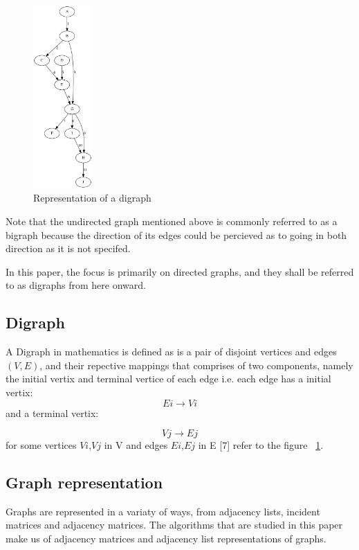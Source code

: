 \begin{figure}[H]
  \begin{center}
      \includegraphics[width=0.2\textwidth]{directedgraph.png}
  \end{center}    
  \caption{Representation of a digraph}
  \label{fig:directedgraph}
\end{figure} 
Note that the undirected graph mentioned above is commonly referred to as a bigraph because the direction
of its edges could be percieved as to going in both direction as it is not specifed.

In this paper, the focus is primarily on directed graphs, and they shall be referred to as digraphs from here onward.

\subsection{Digraph}
A Digraph in mathematics is defined as is a pair of disjoint vertices and edges $(V,E)$, and their repective mappings that comprises of two components, namely the initial vertix and 
terminal vertice of each edge i.e. each edge has a initial vertix: 
  \begin{equation}
    Ei\rightarrow Vi
  \end{equation} 
 and a terminal vertix:

  \begin{equation}
    Vj\rightarrow Ej
  \end{equation} 
   for some vertices $Vi$,$Vj$ in V and edges $Ei$,$Ej$ in E [7] refer to the figure ~\ref{fig:directedgraph}.

\subsection{Graph representation}
Graphs are represented in a variaty of ways, from adjacency lists, incident matrices and adjacency matrices. The algorithms that are studied in this paper make us of adjacency matrices and adjacency list representations of graphs. 

